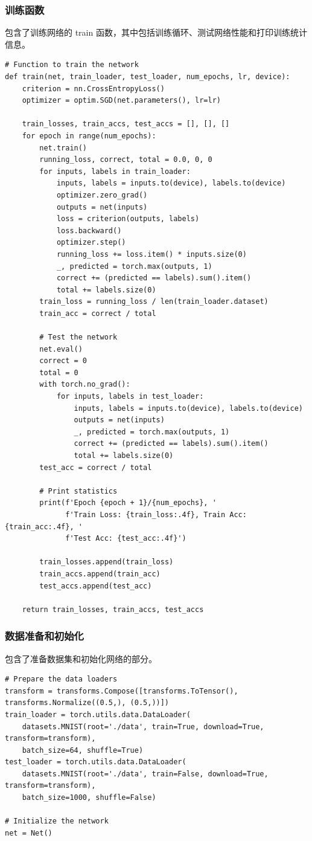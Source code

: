 \documentclass[a4paper,12pt]{article}
\begin{document}
\subsubsection{训练函数}
包含了训练网络的 train 函数，其中包括训练循环、测试网络性能和打印训练统计信息。
\begin{lstlisting}
# Function to train the network
def train(net, train_loader, test_loader, num_epochs, lr, device):
    criterion = nn.CrossEntropyLoss()
    optimizer = optim.SGD(net.parameters(), lr=lr)

    train_losses, train_accs, test_accs = [], [], []
    for epoch in range(num_epochs):
        net.train()
        running_loss, correct, total = 0.0, 0, 0
        for inputs, labels in train_loader:
            inputs, labels = inputs.to(device), labels.to(device)
            optimizer.zero_grad()
            outputs = net(inputs)
            loss = criterion(outputs, labels)
            loss.backward()
            optimizer.step()
            running_loss += loss.item() * inputs.size(0)
            _, predicted = torch.max(outputs, 1)
            correct += (predicted == labels).sum().item()
            total += labels.size(0)
        train_loss = running_loss / len(train_loader.dataset)
        train_acc = correct / total

        # Test the network
        net.eval()
        correct = 0
        total = 0
        with torch.no_grad():
            for inputs, labels in test_loader:
                inputs, labels = inputs.to(device), labels.to(device)
                outputs = net(inputs)
                _, predicted = torch.max(outputs, 1)
                correct += (predicted == labels).sum().item()
                total += labels.size(0)
        test_acc = correct / total

        # Print statistics
        print(f'Epoch {epoch + 1}/{num_epochs}, '
              f'Train Loss: {train_loss:.4f}, Train Acc: {train_acc:.4f}, '
              f'Test Acc: {test_acc:.4f}')

        train_losses.append(train_loss)
        train_accs.append(train_acc)
        test_accs.append(test_acc)

    return train_losses, train_accs, test_accs
\end{lstlisting}

\subsubsection{数据准备和初始化}
包含了准备数据集和初始化网络的部分。
\begin{lstlisting}
# Prepare the data loaders
transform = transforms.Compose([transforms.ToTensor(), transforms.Normalize((0.5,), (0.5,))])
train_loader = torch.utils.data.DataLoader(
    datasets.MNIST(root='./data', train=True, download=True, transform=transform),
    batch_size=64, shuffle=True)
test_loader = torch.utils.data.DataLoader(
    datasets.MNIST(root='./data', train=False, download=True, transform=transform),
    batch_size=1000, shuffle=False)

# Initialize the network
net = Net()
\end{lstlisting}
\end{document}
